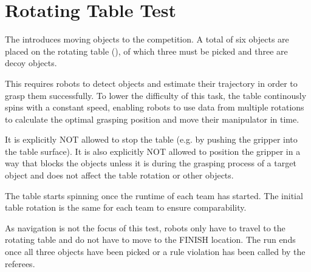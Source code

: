 \section{Rotating Table Test}
\label{sec:Rotating Table Test}

The  introduces moving objects to the competition.
A total of six objects are placed on the rotating table (), of which three must be picked and three are decoy objects.

This requires robots to detect objects and estimate their trajectory in order to grasp them successfully.
To lower the difficulty of this task, the table continously spins with a constant speed, enabling robots to use data from multiple rotations to calculate the optimal grasping position and move their manipulator in time.

It is explicitly NOT allowed to stop the table (e.g. by pushing the gripper into the table surface).
It is also explicitly NOT allowed to position the gripper in a way that blocks the objects 
unless it is during the grasping process of a target object and does not affect the table rotation or other objects.

The table starts spinning once the runtime of each team has started.
The initial table rotation is the same for each team to ensure comparability.  

As navigation is not the focus of this test, robots only have to travel to the rotating table and do not have to move to the FINISH location. The run ends once all three objects have been picked or a rule violation has been called by the referees.



